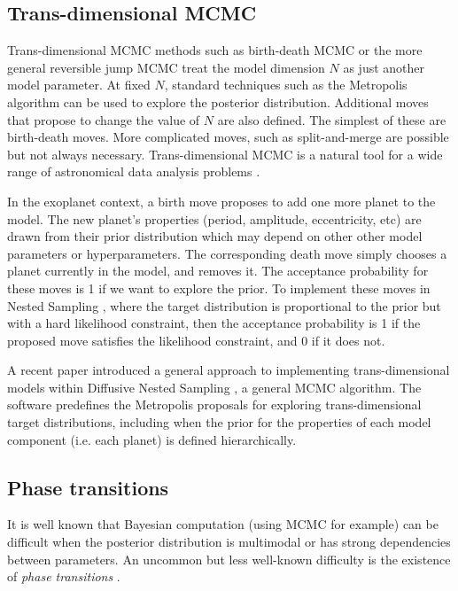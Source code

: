 \documentclass[useAMS,usenatbib]{mn2e}
\begin{document}
\subsection{Trans-dimensional MCMC}
Trans-dimensional MCMC methods such as birth-death MCMC \citep{birthdeath} or the
more general reversible jump MCMC \citep{green} treat the model dimension
$N$ as just another model parameter. At fixed $N$, standard techniques such
as the Metropolis algorithm can be used to explore the posterior distribution.
Additional moves that propose to change the value of $N$ are also defined. The
simplest of these are birth-death moves. More complicated moves, such as
split-and-merge are possible but not always necessary.
Trans-dimensional MCMC is a natural tool for a wide range of astronomical
data analysis problems \citep[e.g.][]{umstatter, walmswell, starfield}.

In the exoplanet context, a birth move
proposes to add one more planet to the model. The new planet's properties
(period, amplitude, eccentricity, etc) are drawn from their prior distribution
which may depend on other other model parameters or hyperparameters.
The corresponding death move simply chooses a planet currently in the model,
and removes it. The acceptance probability for these moves is 1 if we want
to explore the prior. To implement these moves in Nested Sampling
\citep{skilling}, where the target distribution is proportional to the prior but with a hard likelihood
constraint, then the acceptance probability is 1 if the proposed move
satisfies the likelihood constraint, and 0 if it does not.

A recent paper \citep{rjobject} introduced a general approach to implementing
trans-dimensional models within Diffusive Nested Sampling \citep{dnest}, a
general MCMC algorithm. The \citet{rjobject} software predefines the
Metropolis proposals for exploring trans-dimensional target distributions,
including when the prior for the properties of each model component (i.e. each
planet) is defined hierarchically.

\subsection{Phase transitions}
It is well known that Bayesian computation (using MCMC for example) can be
difficult when the posterior distribution is multimodal or has strong
dependencies between parameters. An uncommon but less well-known difficulty
is the existence of {\it phase transitions} \citep{skilling}.
\end{document}
